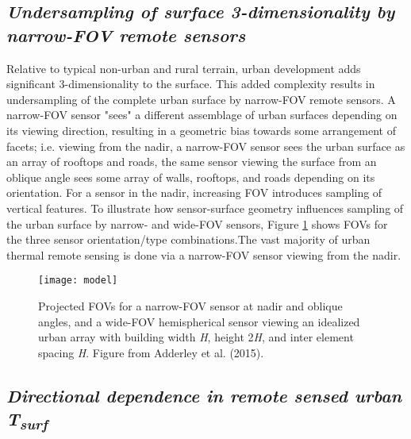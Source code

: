 \begin{bibunit}

\subsection*{\textnormal{\textit{Undersampling of surface 3-dimensionality by narrow-FOV remote sensors}}}

Relative to typical non-urban and rural terrain, urban development adds significant 3-dimensionality to the surface. This added complexity results in undersampling of the complete urban surface by narrow-FOV remote sensors. A narrow-FOV sensor "sees" a different assemblage of urban surfaces depending on its viewing direction, resulting in a geometric bias towards some arrangement of facets; i.e. viewing from the nadir, a narrow-FOV sensor sees the urban surface as an array of rooftops and roads, the same sensor viewing the surface from an oblique angle sees some array of walls, rooftops, and roads depending on its orientation. For a sensor in the nadir, increasing FOV introduces sampling of vertical features. To illustrate how sensor-surface geometry influences sampling of the urban surface by narrow- and wide-FOV sensors, Figure \ref{model} shows FOVs for the three sensor orientation/type combinations.The vast majority of urban thermal remote sensing is done via a narrow-FOV sensor viewing from the nadir.

\begin{figure}[H]
	\centering
	\texttt{[image: model]}
	\caption{Projected FOVs for a narrow-FOV sensor at nadir and oblique angles, and a wide-FOV hemispherical sensor viewing an idealized urban array with building width \textit{H}, height 2\textit{H}, and inter element spacing \textit{H}. Figure from Adderley et al. (2015).}
	\label{model}
\end{figure}

\subsection*{\textnormal{\textit{Directional dependence in remote sensed urban T\textsubscript{surf}}}}


\end{bibunit}
